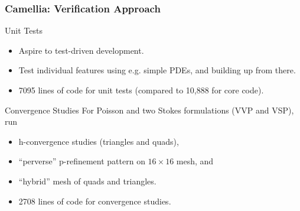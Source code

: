 \documentclass[mathserif]{beamer}
\begin{document}
\begin{frame}                                                                                                                                                                          
\frametitle{Camellia: Verification Approach}
\vspace {-1 mm}
\begin{block}{Unit Tests}
\begin{itemize}
\item Aspire to test-driven development.
\item Test individual features using e.g. simple PDEs, and building up from there.
\item 7095 lines of code for unit tests (compared to 10,888 for core code).
\end{itemize}
\end{block}
\begin{block}{Convergence Studies}
For Poisson and two Stokes formulations (VVP and VSP), run
\begin{itemize}
\item h-convergence studies (triangles and quads),
\item ``perverse'' p-refinement pattern on $16 \times 16$ mesh, and
\item ``hybrid'' mesh of quads and triangles.
\item 2708 lines of code for convergence studies.
\end{itemize}
\end{block}
\end{frame}
\end{document}
